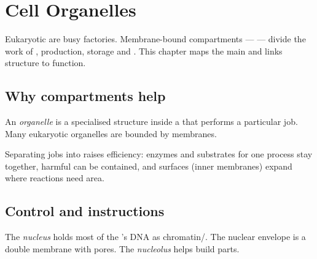 \chapter{Cell Organelles}\label{ch:g8:organelles}

Eukaryotic  are busy factories. Membrane-bound compartments ---
 --- divide the work of ,  production, storage and
. This chapter maps the main  and links structure to
function.

\section{Why compartments help}

\begin{definition}[Organelle]\label{def:g8:organelles:organelle}
An \emph{organelle} is a specialised structure inside a
 that performs a particular job. Many eukaryotic organelles are
bounded by membranes.
\end{definition}

\begin{proposition}\label{prop:g8:organelles:labour}
Separating jobs into  raises efficiency: enzymes and substrates
for one process stay together, harmful  can be contained, and
surfaces (inner membranes) expand where reactions need area.
\end{proposition}
\admitted

\section{Control and instructions}

\begin{definition}[Nucleus]\label{def:g8:organelles:nucleus}
The \emph{nucleus} holds most of the 's DNA as
chromatin/. The nuclear envelope is a double membrane with
pores. The \emph{nucleolus} helps build  parts.
\end{definition}

